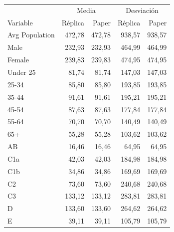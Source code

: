 \begin{tabular}{lrrrr}\toprule
 & \multicolumn{2}{c}{Media} & \multicolumn{2}{c}{Desviación} \\
Variable & Réplica & Paper & Réplica & Paper \\\midrule
Avg Population & 472,78 & 472,78 & 938,57 & 938,57 \\
Male & 232,93 & 232,93 & 464,99 & 464,99 \\
Female & 239,83 & 239,83 & 474,95 & 474,95 \\
Under 25 & 81,74 & 81,74 & 147,03 & 147,03 \\
25-34 & 85,80 & 85,80 & 193,85 & 193,85 \\
35-44 & 91,61 & 91,61 & 195,21 & 195,21 \\
45-54 & 87,63 & 87,63 & 177,84 & 177,84 \\
55-64 & 70,70 & 70,70 & 140,49 & 140,49 \\
65+ & 55,28 & 55,28 & 103,62 & 103,62 \\
AB & 16,46 & 16,46 & 64,95 & 64,95 \\
C1a & 42,03 & 42,03 & 184,98 & 184,98 \\
C1b & 34,86 & 34,86 & 169,69 & 169,69 \\
C2 & 73,60 & 73,60 & 240,68 & 240,68 \\
C3 & 133,12 & 133,12 & 283,81 & 283,81 \\
D & 133,60 & 133,60 & 264,62 & 264,62 \\
E & 39,11 & 39,11 & 105,79 & 105,79 \\
\bottomrule\end{tabular}
